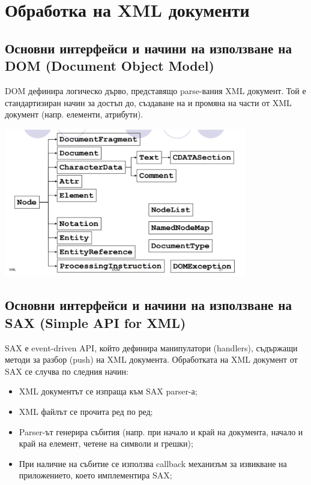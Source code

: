 \documentclass[fleqn,12pt]{article}
\begin{document}
\section{Обработка на XML документи}

\subsection{Основни интерфейси и начини на използване на DOM (Document Object Model)}

DOM дефинира логическо дърво, представящо parse-вания XML документ.
Той е стандартизиран начин за достъп до, създаване на и промяна на части от XML документ (напр. елементи, атрибути).

\begin{center} \includegraphics[width=400px]{dom.png} \end{center}

\subsection{Основни интерфейси и начини на използване на SAX (Simple API for XML)}

SAX е event-driven API, който дефинира манипулатори (handlers), съдържащи методи за разбор (push) на XML документа.
Обработката на XML документ от SAX се случва по следния начин:
\begin{itemize}
    \item XML документът се изпраща към SAX parser-а;
    \item XML файлът се прочита ред по ред;
    \item Parser-ът генерира събития (напр. при начало и край на документа, начало и край на елемент, четене на символи и грешки);
    \item При наличие на събитие се използва callback механизъм за извикване на приложението, което имплементира SAX;
\end{itemize}
\end{document}

